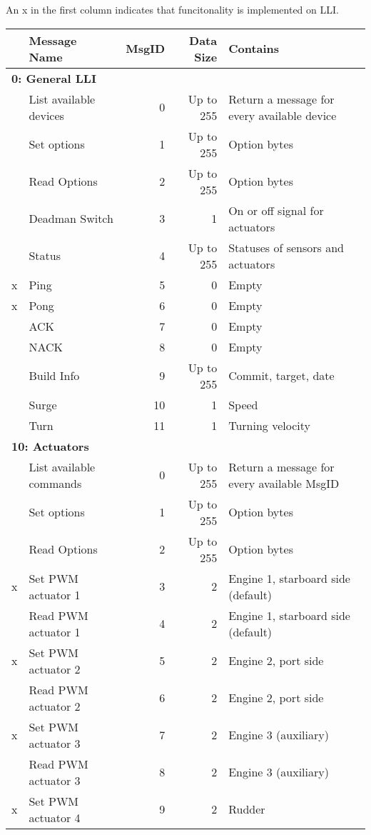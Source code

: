 An x in the first column indicates that funcitonality is implemented on \ac{LLI}.

\begin{table}[h]
\centering
	\begin{tabular}{llrrl}
	\toprule
	& \textbf{Message Name} & \textbf{MsgID} & \textbf{Data Size} & \textbf{Contains}\\
	\midrule
	\multicolumn{5}{l}{\textbf{0: General LLI	}}\\
	\midrule
	& List available devices & 0 & Up to 255 & Return a message for every available device\\
	& Set options & 1 & Up to 255 & Option bytes\\
	& Read Options & 2 & Up to 255 & Option bytes\\
	& Deadman Switch & 3 & 1 & On or off signal for actuators \\
	& Status & 4 & Up to 255 & Statuses of sensors and actuators \\
	x& Ping & 5 & 0 & Empty \\
	x& Pong & 6 & 0 & Empty \\
	& ACK & 7 & 0 & Empty \\
	& NACK & 8 & 0 & Empty \\
	& Build Info & 9 & Up to 255 & Commit, target, date\\
	& Surge & 10 & 1 & Speed\\
	& Turn & 11 & 1 & Turning velocity\\
	\bottomrule
	\multicolumn{5}{l}{\textbf{10: Actuators}}\\
	\midrule
	& List available commands & 0 & Up to 255 & Return a message for every available MsgID\\
	& Set options & 1 & Up to 255 & Option bytes\\
	& Read Options & 2 & Up to 255 & Option bytes\\
	x& Set PWM actuator 1  & 3 & 2 & Engine 1, starboard side (default)\\
	& Read PWM actuator 1 & 4 & 2 & Engine 1, starboard side (default)\\
	x& Set PWM actuator 2 & 5 & 2 & Engine 2, port side\\
	& Read PWM actuator 2 & 6 & 2 & Engine 2, port side\\
	x& Set PWM actuator 3 & 7 & 2 & Engine 3 (auxiliary)\\
	& Read PWM actuator 3 & 8 & 2 & Engine 3 (auxiliary)\\ 
	x& Set PWM actuator 4 & 9 & 2 & Rudder\\

\end{tabular}
\end{table}
